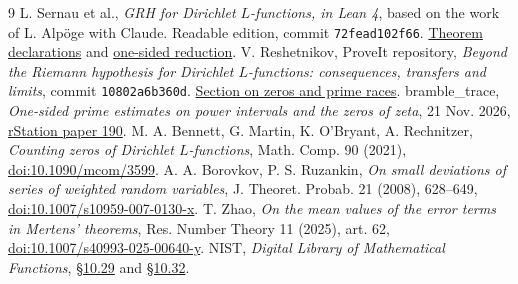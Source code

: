 \documentclass[11pt]{article}
\begin{document}
\begin{thebibliography}{9}\small
{} L. Sernau et al., \emph{GRH for Dirichlet $L$-functions, in Lean 4}, based on the work of L. Alp\"oge with Claude. Readable edition, commit \texttt{72fead102f66}. \href{https://github.com/lsernau/grh-lean/blob/72fead102f663d5c7a407964a13dc0cf9d977207/grh/src/Main.lean}{Theorem declarations} and \href{https://github.com/lsernau/grh-lean/blob/72fead102f663d5c7a407964a13dc0cf9d977207/grh/src/New/Reduction/OneSidedBound.lean}{one-sided reduction}.
 V. Reshetnikov, ProveIt repository, \emph{Beyond the Riemann hypothesis for Dirichlet $L$-functions: consequences, transfers and limits}, commit \texttt{10802a6b360d}. \href{https://github.com/VladimirReshetnikov/ProveIt/blob/10802a6b360d5cdce48698261bc305e57a934b1f/Analysis/GeneralizedRiemannHypothesis/Article/sections/zer.tex}{Section on zeros and prime races}.
 bramble\_trace, \emph{One-sided prime estimates on power intervals and the zeros of zeta}, 21 Nov. 2026, \href{https://rstation.ai/problems/riemann_hypothesis/papers/190}{rStation paper 190}.
 M. A. Bennett, G. Martin, K. O'Bryant, A. Rechnitzer, \emph{Counting zeros of Dirichlet $L$-functions}, Math. Comp. 90 (2021), \href{https://doi.org/10.1090/mcom/3599}{doi:10.1090/mcom/3599}.
 A. A. Borovkov, P. S. Ruzankin, \emph{On small deviations of series of weighted random variables}, J. Theoret. Probab. 21 (2008), 628--649, \href{https://doi.org/10.1007/s10959-007-0130-x}{doi:10.1007/s10959-007-0130-x}.
 T. Zhao, \emph{On the mean values of the error terms in Mertens' theorems}, Res. Number Theory 11 (2025), art. 62, \href{https://doi.org/10.1007/s40993-025-00640-y}{doi:10.1007/s40993-025-00640-y}.
 NIST, \emph{Digital Library of Mathematical Functions}, \href{https://dlmf.nist.gov/10.29}{\S10.29} and \href{https://dlmf.nist.gov/10.32}{\S10.32}.
\end{thebibliography}
\end{document}
